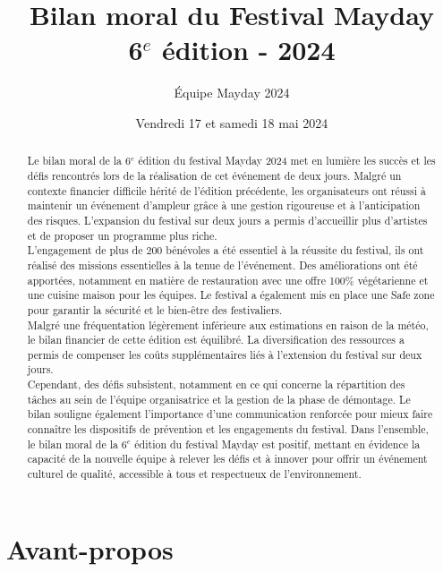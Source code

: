 \documentclass[12pt,a4paper]{report}
\title{Bilan moral du Festival Mayday \\ 6$^e$ édition - 2024}
\author{Équipe Mayday 2024}
\date{Vendredi 17 et samedi 18 mai 2024}
\begin{document}
\maketitle

\begin{abstract} %
Le bilan moral de la 6$^e$ édition du festival Mayday 2024 met en lumière les succès et les défis rencontrés lors de la réalisation de cet événement de deux jours. Malgré un contexte financier difficile hérité de l’édition précédente, les organisateurs ont réussi à maintenir un événement d’ampleur grâce à une gestion rigoureuse et à l’anticipation des risques. L’expansion du festival sur deux jours a permis d’accueillir plus d’artistes et de proposer un programme plus riche.\\

L’engagement de plus de 200 bénévoles a été essentiel à la réussite du festival, ils ont réalisé des missions essentielles à la tenue de l'événement. Des améliorations ont été apportées, notamment en matière de restauration avec une offre 100\% végétarienne et une cuisine maison pour les équipes. Le festival a également mis en place une \og Safe zone \fg{} pour garantir la sécurité et le bien-être des festivaliers.\\

Malgré une fréquentation légèrement inférieure aux estimations en raison de la météo, le bilan financier de cette édition est équilibré. La diversification des ressources a permis de compenser les coûts supplémentaires liés à l’extension du festival sur deux jours. \\

Cependant, des défis subsistent, notamment en ce qui concerne la répartition des tâches au sein de l’équipe organisatrice et la gestion de la phase de démontage. Le bilan souligne également l’importance d’une communication renforcée pour mieux faire connaître les dispositifs de prévention et les engagements du festival. Dans l’ensemble, le bilan moral de la 6$^e$ édition du festival Mayday est positif, mettant en évidence la capacité de la nouvelle équipe à relever les défis et à innover pour offrir un événement culturel de qualité, accessible à tous et respectueux de l’environnement.
\end{abstract}

\tableofcontents

\newpage

\section*{Avant-propos}
\end{document}
